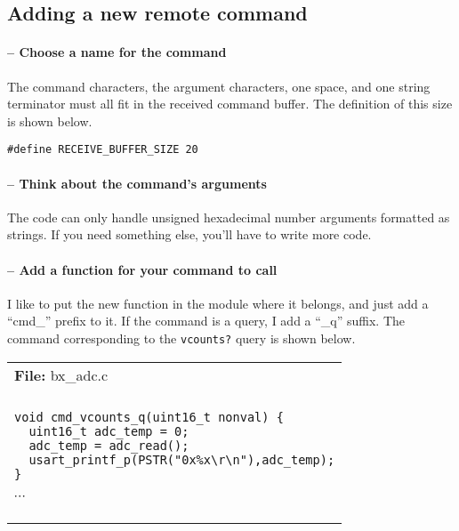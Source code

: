 \clearpage{}
\subsection{Adding a new remote command}

\setcounter{comcount}{1}
\paragraph{ --  Choose a name for the command}
The command characters, the argument characters, one space, and one
string terminator must all fit in the received command buffer. The
definition of this size is shown below.

{ \texttt{\#define RECEIVE\_BUFFER\_SIZE 20} }

\addtocounter{comcount}{1}
\paragraph{ -- Think about the command's arguments}
The code can only handle unsigned hexadecimal number arguments
formatted as strings.  If you need something else, you'll have to
write more code.

\addtocounter{comcount}{1}
\paragraph{ -- Add a function for your command to call}
I like to put the new function in the module where it belongs, and
just add a ``cmd\_'' prefix to it.  If the command is a query, I add a
``\_q'' suffix.  The command corresponding to the \texttt{vcounts?}
query is shown below.

\begin{center}
  \vspace{-\baselineskip}
  \begin{tabular}{|l|} \hline
    \rowcolor[gray]{0.8}
    \begin{minipage}[c]{\textwidth - 2\tabcolsep}
      \textbf{File:}
      bx\_adc.c
    \end{minipage}\\
    \begin{minipage}[c]{\textwidth - 2\tabcolsep}
      \vspace{0.5\baselineskip}
      $\cdots$ \\
      \begin{minipage}[c]{\textwidth - 2\tabcolsep}
        \lstset{language=c}
        \begin{lstlisting}
void cmd_vcounts_q(uint16_t nonval) {
  uint16_t adc_temp = 0;
  adc_temp = adc_read();
  usart_printf_p(PSTR("0x%x\r\n"),adc_temp);
}
        \end{lstlisting}
      \end{minipage}
      $\cdots$\\
      \vspace{-0.5\baselineskip}
    \end{minipage}\\
    \hline
  \end{tabular}
\end{center}


